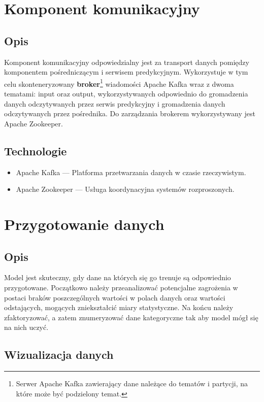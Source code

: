 \documentclass[12pt, a4paper]{report}
\begin{document}
\chapter{Komponent komunikacyjny}
\section{Opis}
Komponent komunikacyjny odpowiedzialny jest za transport danych pomiędzy komponentem pośredniczącym i serwisem predykcyjnym.
Wykorzystuje w tym celu skonteneryzowany \textbf{broker}\footnote{Serwer Apache Kafka zawierający dane należące do tematów i partycji, na które może być podzielony temat.}
wiadomości Apache Kafka wraz z dwoma tematami: input oraz output, wykorzystywanych
odpowiednio do gromadzenia danych odczytywanych przez serwis predykcyjny i gromadzenia danych odczytywanych przez pośrednika.
Do zarządzania brokerem wykorzystywany jest Apache Zookeeper.
\section{Technologie}
\begin{itemize}
    \item Apache Kafka --- Platforma przetwarzania danych w czasie rzeczywistym.
    \item Apache Zookeeper --- Usługa koordynacyjna systemów rozproszonych.
\end{itemize}

\chapter{Przygotowanie danych}
\section{Opis}
    Model jest skuteczny, gdy dane na których się go trenuje są odpowiednio przygotowane. Początkowo należy przeanalizować potencjalne zagrożenia w postaci braków poszczególnych wartości w polach danych oraz wartości odstających, mogących zniekształcić miary statystyczne. Na końcu należy zfaktoryzować, a zatem znumeryzować dane kategoryczne tak aby model mógł się na nich uczyć.

\section{Wizualizacja danych}
\end{document}
